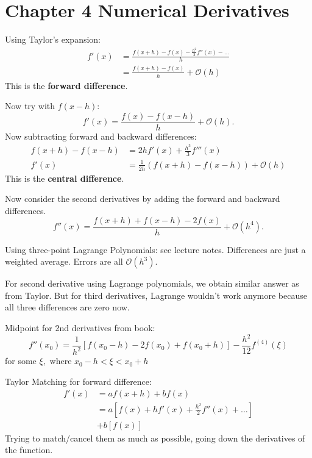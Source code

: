 \documentclass[class=article, crop=false]{standalone}
\theoremstyle{plain}
\theoremstyle{remark}
\begin{document}
\section*{Chapter 4 Numerical Derivatives}

Using Taylor's expansion:
\begin{equation*}
\begin{split}
	f'(x) &= \frac{f(x+h)-f(x)-\frac{h^2}{2}f''(x) - \ldots}{h}\\ 
	&= \frac{f(x+h)-f(x)}{h} + \mathcal{O}(h) 
\end{split}
\end{equation*}
This is the \textbf{forward difference}.

Now try with $f(x-h) $:
\[
	f'(x) = \frac{f(x)-f(x-h)  }{h}+\mathcal{O}(h)  
.\] 
Now subtracting forward and backward differences:
\begin{equation*}
\begin{split}
	f(x+h) -f(x-h) &=2hf'(x) + \frac{h^3}{3}f'''(x) \\ 
	f'(x)&=\frac{1}{2h}(f(x+h) -f(x-h) )+ \mathcal{O}(h)  
\end{split}
\end{equation*}
This is the \textbf{central difference}.

Now consider the second derivatives by adding the forward and backward differences.
 \[
	 f''(x) = \frac{f(x+h)+f(x-h) -2f(x)  }{h} + \mathcal{O}(h^4) 
.\] 

Using three-point Lagrange Polynomials: see lecture notes. Differences are just a weighted average. Errors are all $\mathcal{O}(h^3)$.

For second derivative using Lagrange polynomials, we obtain similar answer as from Taylor. But for third derivatives, Lagrange wouldn't work anymore because all three differences are zero now.

Midpoint for 2nd derivatives from book:
\[
f'' \left(x_{0}\right)=\frac{1}{h^{2}}\left[f\left(x_{0}-h\right)-2 f\left(x_{0}\right)+f\left(x_{0}+h\right)\right]-\frac{h^{2}}{12} f^{(4)}(\xi) \]
for some $\xi,$ where $x_{0}-h<\xi<x_{0}+h$

Taylor Matching for forward difference:
\begin{equation*}
\begin{split}
	f'(x) &= af(x+h) +bf(x)\\
	      &=a[f(x) +hf'(x)+\frac{h^2}{2}f''(x) + \ldots]\\
	      &+b[f(x) ]
\end{split}
\end{equation*}
Trying to match/cancel them as much as possible, going down the derivatives of the function.
\end{document}
